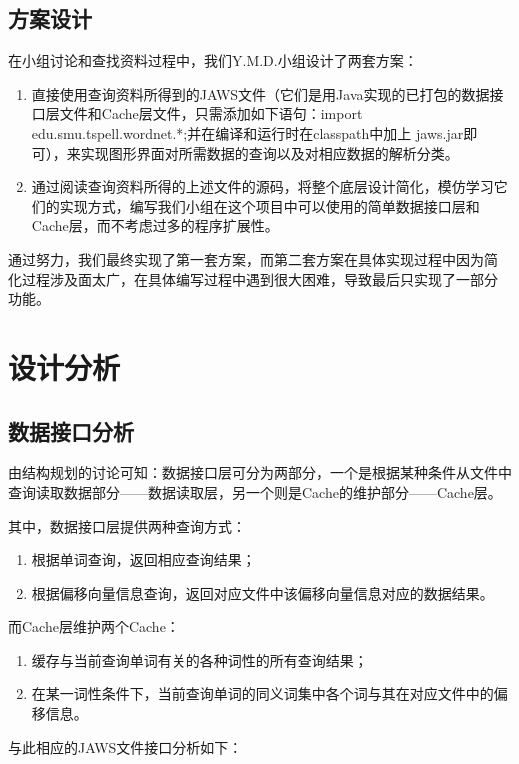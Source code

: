 \documentclass[a4paper,unicode=true,xetex]{article}
\begin{document}
\subsection{方案设计}

在小组讨论和查找资料过程中，我们Y.M.D.小组设计了两套方案：

\begin{enumerate}
\item 直接使用查询资料所得到的JAWS文件（它们是用Java实现的已打包的数据接口层文件和Cache层文件，只需添加如下语句：import edu.smu.tspell.wordnet.*;并在编译和运行时在classpath中加上 jaws.jar即可），来实现图形界面对所需数据的查询以及对相应数据的解析分类。
\item 通过阅读查询资料所得的上述文件的源码，将整个底层设计简化，模仿学习它们的实现方式，编写我们小组在这个项目中可以使用的简单数据接口层和Cache层，而不考虑过多的程序扩展性。
\end{enumerate}

通过努力，我们最终实现了第一套方案，而第二套方案在具体实现过程中因为简%
化过程涉及面太广，在具体编写过程中遇到很大困难，导致最后只实现了一部分%
功能。

\section{设计分析}

\subsection{数据接口分析}

由结构规划的讨论可知：数据接口层可分为两部分，一个是根据某种条件从文件中查询读取数据部分——数据读取层，另一个则是Cache的维护部分——Cache层。

其中，数据接口层提供两种查询方式：
\begin{enumerate}
\item 根据单词查询，返回相应查询结果；
\item 根据偏移向量信息查询，返回对应文件中该偏移向量信息对应的数据结果。
\end{enumerate}
而Cache层维护两个Cache：
\begin{enumerate}
\item 缓存与当前查询单词有关的各种词性的所有查询结果；
\item 在某一词性条件下，当前查询单词的同义词集中各个词与其在对应文件中的偏移信息。
\end{enumerate}

与此相应的JAWS文件接口分析如下：
\end{document}

